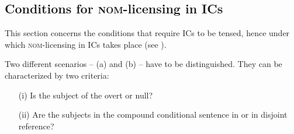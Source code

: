 \documentclass[output=paper,colorlinks,citecolor=brown,newtxmath]{langsci/langscibook}
\begin{document}

\subsection{Conditions for \textsc{nom}-licensing in ICs}\label{sec:nom_conditions}

This section concerns the conditions that require ICs to be tensed, hence under which \textsc{nom}-licensing in ICs takes place (see ).

Two different scenarios -- (a) and (b) -- have to be distinguished. They can be characterized by two criteria:

\begin{itemize}
\item[(i)] Is the subject of the  overt or null?
\item[(ii)] Are the subjects in the compound conditional sentence in  or in disjoint reference?
\end{itemize}

\end{document}
